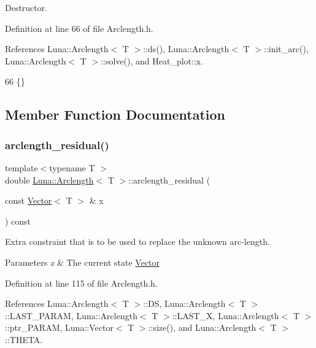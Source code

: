 Destructor. 



Definition at line 66 of file Arclength.\+h.



References Luna\+::\+Arclength$<$ T $>$\+::ds(), Luna\+::\+Arclength$<$ T $>$\+::init\+\_\+arc(), Luna\+::\+Arclength$<$ T $>$\+::solve(), and Heat\+\_\+plot\+::x.


\begin{DoxyCode}
66 \{\}
\end{DoxyCode}


\subsection{Member Function Documentation}
\mbox{\label{classLuna_1_1Arclength_af47a50bb4ce666b505fe990ab44063db}} 
\subsubsection{\texorpdfstring{arclength\+\_\+residual()}{arclength\_residual()}}
{\footnotesize\ttfamily template$<$typename T $>$ \\
double \hyperlink{classLuna_1_1Arclength}{Luna\+::\+Arclength}$<$ T $>$\+::arclength\+\_\+residual (\begin{DoxyParamCaption}\item[{const \hyperlink{classLuna_1_1Vector}{Vector}$<$ T $>$ \&}]{x }\end{DoxyParamCaption}) const\hspace{0.3cm}{\ttfamily [protected]}}



Extra constraint that is to be used to replace the unknown arc-\/length. 


\begin{DoxyParams}{Parameters}
{\em x} & The current state \hyperlink{classLuna_1_1Vector}{Vector} \\
\hline
\end{DoxyParams}


Definition at line 115 of file Arclength.\+h.



References Luna\+::\+Arclength$<$ T $>$\+::\+DS, Luna\+::\+Arclength$<$ T $>$\+::\+L\+A\+S\+T\+\_\+\+P\+A\+R\+AM, Luna\+::\+Arclength$<$ T $>$\+::\+L\+A\+S\+T\+\_\+X, Luna\+::\+Arclength$<$ T $>$\+::ptr\+\_\+\+P\+A\+R\+AM, Luna\+::\+Vector$<$ T $>$\+::size(), and Luna\+::\+Arclength$<$ T $>$\+::\+T\+H\+E\+TA.



